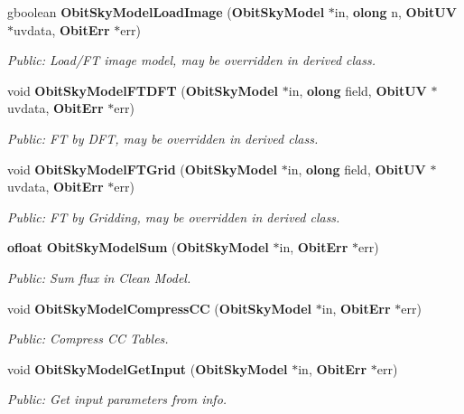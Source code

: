 \begin{CompactItemize}
gboolean {\bf Obit\-Sky\-Model\-Load\-Image} ({\bf Obit\-Sky\-Model} $\ast$in, {\bf olong} n, {\bf Obit\-UV} $\ast$uvdata, {\bf Obit\-Err} $\ast$err)
\begin{CompactList}\small\item\em Public: Load/FT image model, may be overridden in derived class. \item\end{CompactList}\item 
void {\bf Obit\-Sky\-Model\-FTDFT} ({\bf Obit\-Sky\-Model} $\ast$in, {\bf olong} field, {\bf Obit\-UV} $\ast$uvdata, {\bf Obit\-Err} $\ast$err)
\begin{CompactList}\small\item\em Public: FT by DFT, may be overridden in derived class. \item\end{CompactList}\item 
void {\bf Obit\-Sky\-Model\-FTGrid} ({\bf Obit\-Sky\-Model} $\ast$in, {\bf olong} field, {\bf Obit\-UV} $\ast$uvdata, {\bf Obit\-Err} $\ast$err)
\begin{CompactList}\small\item\em Public: FT by Gridding, may be overridden in derived class. \item\end{CompactList}\item 
{\bf ofloat} {\bf Obit\-Sky\-Model\-Sum} ({\bf Obit\-Sky\-Model} $\ast$in, {\bf Obit\-Err} $\ast$err)
\begin{CompactList}\small\item\em Public: Sum flux in Clean Model. \item\end{CompactList}\item 
void {\bf Obit\-Sky\-Model\-Compress\-CC} ({\bf Obit\-Sky\-Model} $\ast$in, {\bf Obit\-Err} $\ast$err)
\begin{CompactList}\small\item\em Public: Compress CC Tables. \item\end{CompactList}\item 
void {\bf Obit\-Sky\-Model\-Get\-Input} ({\bf Obit\-Sky\-Model} $\ast$in, {\bf Obit\-Err} $\ast$err)
\begin{CompactList}\small\item\em Public: Get input parameters from info. \item\end{CompactList}\item 

\end{CompactItemize}
